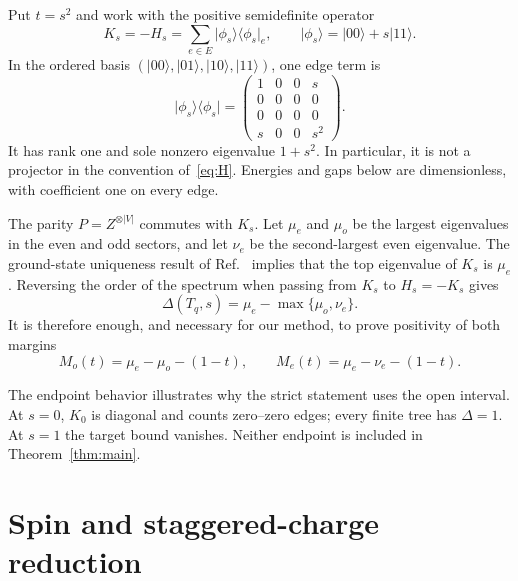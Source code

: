 \documentclass[11pt]{article}
\newcommand{\ket}[1]{\lvert #1\rangle}
\newcommand{\bra}[1]{\langle #1\rvert}
\begin{document}
Put \(t=s^2\) and work with the positive semidefinite operator
\begin{equation}
 K_s=-H_s=\sum_{e\in E}\ket{\phi_s}\!\bra{\phi_s}_e,
 \qquad \ket{\phi_s}=\ket{00}+s\ket{11}.              \label{eq:K}
\end{equation}
In the ordered basis \((\ket{00},\ket{01},\ket{10},\ket{11})\), one edge
term is
\begin{equation}
 \ket{\phi_s}\!\bra{\phi_s}=
 \begin{pmatrix}
 1&0&0&s\\0&0&0&0\\0&0&0&0\\s&0&0&s^2
 \end{pmatrix}.                                       \label{eq:local}
\end{equation}
It has rank one and sole nonzero eigenvalue \(1+s^2\).  In particular,
it is not a projector in the convention of~\eqref{eq:H}.  Energies and
gaps below are dimensionless, with coefficient one on every edge.

The parity \(P=Z^{\otimes |V|}\) commutes with \(K_s\).  Let \(\mu_e\)
and \(\mu_o\) be the largest eigenvalues in the even and odd sectors,
and let \(\nu_e\) be the second-largest even eigenvalue.  The ground-state
uniqueness result of Ref.~\cite{wong2026} implies that the top eigenvalue
of \(K_s\) is \(\mu_e\).  Reversing the order of the spectrum when
passing from \(K_s\) to \(H_s=-K_s\) gives
\begin{equation}
 \Delta(T_q,s)=\mu_e-\max\{\mu_o,\nu_e\}.              \label{eq:gap}
\end{equation}
It is therefore enough, and necessary for our method, to prove positivity
of both margins
\begin{equation}
 M_o(t)=\mu_e-\mu_o-(1-t),\qquad
 M_e(t)=\mu_e-\nu_e-(1-t).                            \label{eq:margins}
\end{equation}

The endpoint behavior illustrates why the strict statement uses the open
interval.  At \(s=0\), \(K_0\) is diagonal and counts zero--zero edges;
every finite tree has \(\Delta=1\).  At \(s=1\) the target bound vanishes.
Neither endpoint is included in Theorem~\ref{thm:main}.

\section{Spin and staggered-charge reduction}              \label{sec:blocks}
\end{document}
